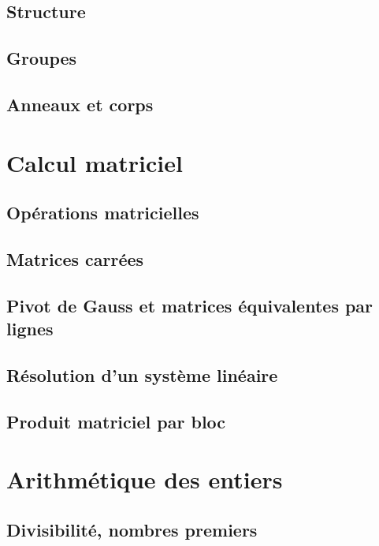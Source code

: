 \documentclass[11pt,twoside,a4paper]{article}
\begin{document}
\subsection{Structure}

\subsection{Groupes}

\subsection{Anneaux et corps}

\newpage
\section{Calcul matriciel}

\subsection{Opérations matricielles}

\subsection{Matrices carrées}

\subsection{Pivot de Gauss et matrices équivalentes par lignes}

\subsection{Résolution d'un système linéaire}

\subsection{Produit matriciel par bloc}

\newpage
\section{Arithmétique des entiers}

\subsection{Divisibilité, nombres premiers}
\end{document}
